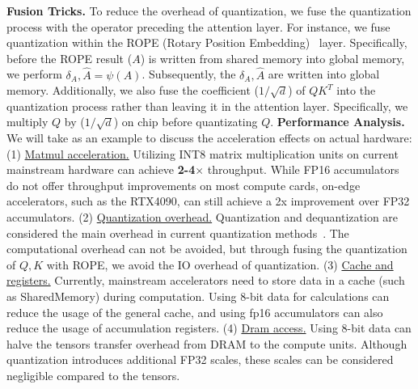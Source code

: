 \textbf{Fusion Tricks.} To reduce the overhead of quantization, we fuse the quantization process with the operator preceding the attention layer. For instance, we fuse quantization within the ROPE (Rotary Position Embedding)~\citep{su2021roformer} layer. Specifically, before the ROPE result ($A$) is written from shared memory into global memory, we perform $\delta_A, \hat A = \psi(A)$. Subsequently, the $\delta_A, \hat A$ are written into global memory. Additionally, we also fuse the coefficient ($1/{\sqrt{d}}$) of $Q K^T$ into the quantization process rather than leaving it in the attention layer. Specifically, we multiply $Q$ by ($1/{\sqrt{d}}$) on chip before quantizating $Q$.
\textbf{Performance Analysis.} We will take \ourb as an example to discuss the acceleration effects on actual hardware:
(1) \underline{Matmul acceleration.} Utilizing INT8 matrix multiplication units on current mainstream hardware can achieve \textbf{2-4}$\times$ throughput. While FP16 accumulators do not offer throughput improvements on most compute cards, on-edge accelerators, such as the RTX4090, can still achieve a 2x improvement over FP32 accumulators.
(2) \underline{Quantization overhead.}
Quantization and dequantization are considered the main overhead in current quantization methods~\citep{lin2024qservew4a8kv4quantizationcodesign}. The computational overhead can not be avoided, but through fusing the quantization of $Q, K$ with ROPE, we avoid the IO overhead of quantization. 
(3) \underline{Cache and registers.} Currently, mainstream accelerators need to store data in a cache (such as SharedMemory) during computation. Using 8-bit data for calculations can reduce the usage of the general cache, and using fp16 accumulators can also reduce the usage of accumulation registers. 
(4) \underline{Dram access.} Using 8-bit data can halve the tensors transfer overhead from DRAM to the compute units. Although quantization introduces additional FP32 scales, these scales can be considered negligible compared to the tensors.
